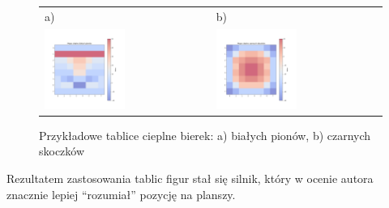 \begin{figure}[ht]
    \centering
    \begin{tabular}{@{}ll@{}}
        a) & b) \\
        \includegraphics[width=0.5\textwidth]{rozdzialy/rozdzial02/2_ulepszenia_oceny/rysunki/bialePiony}
        &
        \includegraphics[width=0.5\textwidth]{rozdzialy/rozdzial02/2_ulepszenia_oceny/rysunki/czarneSkoczki}
    \end{tabular}
    \caption{Przykładowe tablice cieplne bierek: a) białych pionów, b) czarnych skoczków}
    \label{fig: tablice-figur}
\end{figure}

Rezultatem zastosowania tablic figur stał się silnik, który w ocenie autora znacznie lepiej \enquote{rozumiał} pozycję na planszy.